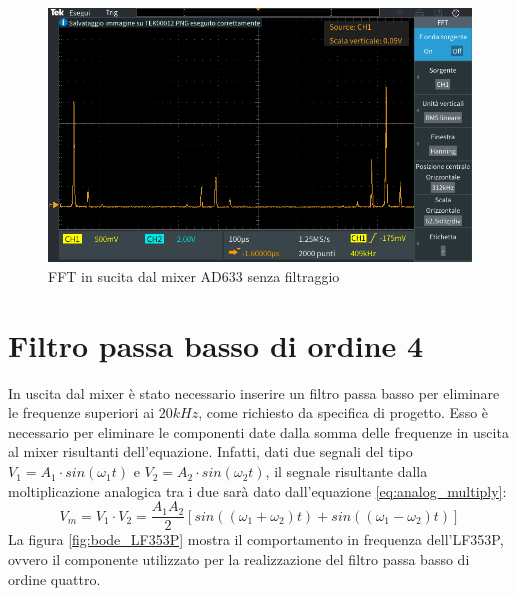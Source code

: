 \documentclass[titlepage]{report}
\begin{document}
	\begin{figure}[H]
		\centering
		\includegraphics[scale = 0.5]{Immagini/ad633_fft_mixed.PNG}
		\caption{FFT in sucita dal mixer AD633 senza filtraggio}
		\label{fig:FFTAD633}
	\end{figure}


	\label{ch:Risultati}
	

\newpage
\section{Filtro passa basso di ordine 4}
	In uscita dal mixer è stato necessario inserire un filtro passa basso per eliminare le frequenze superiori ai $20kHz$, come richiesto da specifica di progetto. Esso è necessario per eliminare le componenti date dalla somma delle frequenze in uscita al mixer risultanti dell'equazione. Infatti, dati due segnali del tipo $ V_1 = A_1 \cdot sin(\omega_1t) $
	e $ V_2 = A_2 \cdot sin(\omega_2t) $, il segnale risultante dalla moltiplicazione analogica tra i due sarà dato dall'equazione \ref{eq:analog_multiply}:
	\begin{equation}
		V_m = V_1 \cdot V_2 = \frac{A_1A_2}{2}[sin((\omega_1 + \omega_2)t) + sin((\omega_1 - \omega_2)t)]
		\label{eq:analog_multiply}
	\end{equation}
	La figura \ref{fig:bode_LF353P} mostra il comportamento in frequenza dell'LF353P, ovvero il componente utilizzato per la realizzazione del filtro passa basso di ordine quattro.
\end{document}
